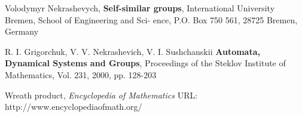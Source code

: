 \documentclass[mat1]{fmfdeloTS}
\begin{document}
\cite[p.~8-32]{Grigor}
\bigskip
\bigskip
\bigskip
\bigskip
\begin{thebibliography}{99}

Volodymyr Nekrashevych, \textbf{Self-similar groups}, International University Bremen, School of Engineering and Sci-
ence, P.O. Box 750 561, 28725 Bremen, Germany

R. I. Grigorchuk, V. V. Nekrashevich, V. I. Sushchanskii \textbf{Automata, Dynamical Systems and Groups}, Proceedings of the Steklov Institute of Mathematics, Vol. 231, 2000, pp. 128-203

Wreath product, \textit{Encyclopedia of Mathematics} URL: http://www.encyclopediaofmath.org/

\end{thebibliography}
\end{document}
